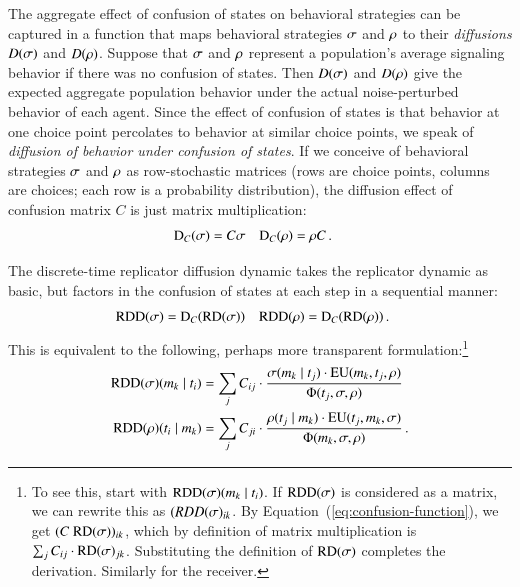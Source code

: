 \documentclass[fleqn,reqno,10pt]{article}
\newcommand{\RD}{\ensuremath{\mathrm{RD}}} %
\newcommand{\RDD}{\ensuremath{\mathrm{RDD}}} %
\newcommand{\Diff}{\ensuremath{\mathrm{D}}} %
\begin{document}
The aggregate effect of confusion of states on behavioral strategies
can be captured in a function that maps behavioral strategies
$\sigma$ and $\rho$ to their \emph{diffusions} $D(\sigma)$ and
$D(\rho)$. Suppose that $\sigma$ and $\rho$ represent a
population's average signaling behavior if there was no confusion of
states. Then $D(\sigma)$ and $D(\rho)$ give the expected aggregate
population behavior under the actual noise-perturbed behavior of each
agent. Since the effect of confusion of states is that behavior at one
choice point percolates to behavior at similar choice points, we speak
of \emph{diffusion of behavior under confusion of states}. If we
conceive of behavioral strategies $\sigma$ and $\rho$ as
row-stochastic matrices (rows are choice points, columns are choices;
each row is a probability distribution), the diffusion effect of
confusion matrix $C$ is just matrix multiplication:
\begin{align}
  \label{eq:confusion-function}
  \Diff_C(\Sstrat) & = C \Sstrat &    \Diff_C(\Rstrat) & = \Rstrat C\,.
\end{align}

The discrete-time replicator diffusion dynamic takes the replicator
dynamic as basic, but factors in the confusion of states at each step
in a sequential manner:
\begin{align*}
  \RDD(\Sstrat) & = \Diff_C(\RD(\Sstrat)) &   \RDD(\Rstrat) & = \Diff_C(\RD(\Rstrat)) \,.
\end{align*}
This is equivalent to the following, perhaps more transparent
formulation:\footnote{To see this, start with $\RDD(\Sstrat)(\messg_k
  \probbar \state_i)$. If $\RDD(\Sstrat)$ is considered as a matrix,
  we can rewrite this as $(RDD(\sigma)_{ik}$. By
  Equation~(\ref{eq:confusion-function}), we get $(C \
  \RD(\Sstrat))_{ik}$, which by definition of matrix multiplication is
  $\sum_j C_{ij} \cdot \RD(\Sstrat)_{jk}$. Substituting the definition
  of $\RD(\Sstrat)$ completes the derivation. Similarly for the
  receiver.}
\begin{align*}
  \RDD(\Sstrat)(\messg_k \probbar \state_i) & = \sum_{j} C_{ij} \cdot
  \frac{\Sstrat(\messg_k \probbar \state_j) \cdot
    \EU(\messg_k, \state_j,\Rstrat)}
  {\Phi(\state_j,\Sstrat, \Rstrat)} \\
    \RDD(\Rstrat)(\state_i \probbar \messg_k) & = \sum_{j} C_{ji} \cdot
  \frac{\Rstrat(\state_j \probbar \messg_k) \cdot
    \EU(\state_j, \messg_k,\Sstrat)} {\Phi(\messg_k,\Sstrat, \Rstrat)}  \,.
\end{align*}
\end{document}

